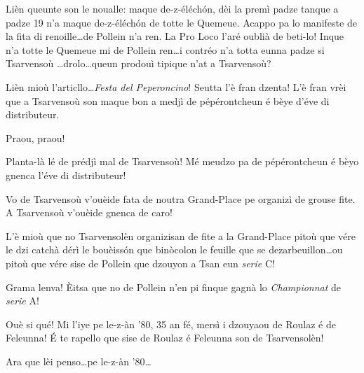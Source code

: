 \begin{drama}


\Taniaspeaks Lièn queunte son le noualle: maque de-z-éléch\'on, dèi la premì padze tanque a padze 19 n'a maque de-z-éléch\'on de totte le Quemeue. Acappo pa lo manifeste de la fita di renoille\ldots de Pollein n'a ren. La Pro Loco l'aré oublià de beti-lo! Inque n'a totte le Quemeue mi de Pollein ren\ldots i contréo n'a totta eunna padze si Tsarvensoù \ldots drolo\ldots queun prodouì tipique n'at a Tsarvensoù?


\Taniaspeaks Lièn mioù l'articllo\ldots \textit{Festa del Peperoncino}! Seutta l'è fran dzenta! L'è fran vrèi que a Tsarvensoù son maque bon a medjì de pépérontcheun é bèye d'éve di distributeur.

\Laurentspeaks{} Praou, praou!


\Laurentspeaks{} Planta-là lé de prédjì mal de Tsarvensoù! Mé meudzo pa de pépérontcheun é bèyo gnenca l'éve di distributeur!

\Taniaspeaks Vo de Tsarvensoù v'ouèide fata de noutra Grand-Place pe organizì de grouse fite. A Tsarvensoù v'ouèide gnenca de caro!

\Laurentspeaks L'è mioù que no Tsarvensolèn organizisan de fite a la Grand-Place pitoù que vére le dzi catchà dérì le bouèiss\'on que binòcolon le feuille que se dezarbeuillon\ldots ou pitoù que vére sise de Pollein que dzouyon a Tsan eun \textit{serie} C!

\Taniaspeaks Grama lenva! \`Eitsa que no de Pollein n'en pi finque gagnà lo \textit{Championnat} de \textit{serie} A!

\Laurentspeaks Ouè si qué! Mi l'iye pe le-z-àn '80, 35 an fé, mersì i dzouyaou de Roulaz é de Feleunna! \'E te rapello que sise de Roulaz é Feleunna son de Tsarvensolèn!

\Taniaspeaks Ara que lèi penso\ldots pe le-z-àn '80\ldots

\act[Le-z-àn '80]

\ridoiver





\end{drama}
